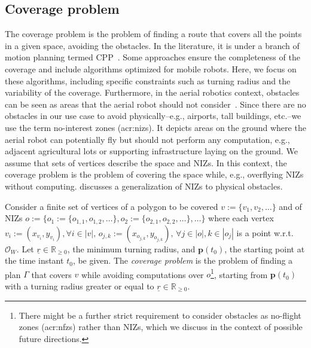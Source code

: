 \subsection{Coverage problem}

The coverage problem is the problem of finding a route that covers all the points in a given space, avoiding the obstacles. In the literature, it is under a branch of motion planning termed CPP~\citep{choset1998coverage,choset2001coverage,galceran2013survey}. Some approaches ensure the completeness of the coverage and include algorithms optimized for mobile robots. Here, we focus on these algorithms, including specific constraints such as turning radius and the variability of the coverage.
Furthermore, in the aerial robotics context, obstacles can be seen as areas that the aerial robot should not consider~\citep{cabreira2019survey}. Since there are no obstacles in our use case to avoid physically--e.g., airports, tall buildings, etc.--we use the term no-interest zones (\Gls{acr:niz}s). It depicts areas on the ground where the aerial robot can potentially fly but should not perform any computation, e.g., adjacent agricultural lots or supporting infrastructure laying on the ground. We assume that sets of vertices describe the space and NIZs. In this context, the coverage problem is the problem of covering the space while, e.g., overflying NIZs without computing. 
 discusses a generalization of NIZs to physical obstacles. 

\begin{pb}
  \label{pb:cov-pb}
  Consider a finite set of vertices of a polygon to be covered $v:=\{v_1,v_2,\dots\}$ and of NIZs $o:=\{o_1:=\{o_{1,1},o_{1,2},\dots\},o_2:=\{o_{2,1},o_{2,2},\dots\},\dots\}$ where each vertex $v_i:=(x_{v_i},y_{v_i}),\forall i\in|v|,\,o_{j,k}:=(x_{o_{j,k}},y_{o_{j,k}}),\,\forall j\in|o|,k\in|o_j|$ is a point w.r.t. $\mathcal{O}_W$. Let $\underline{r}\in\mathbb{R}_{\geq 0}$, the minimum turning radius, and $\mathbf{p}(t_0)$, the starting point at the time instant $t_0$, be given. The \emph{coverage problem} is the problem of finding a plan $\Gamma$ that covers $v$ while avoiding computations over $o$\footnote{There might be a further strict requirement to consider obstacles as no-flight zones (\Gls{acr:nfz}s) rather than NIZs, which we discuss in the context of possible future directions.}, starting from $\mathbf{p}(t_0)$ with a turning radius greater or equal to $\underline{r}\in\mathbb{R}_{\geq 0}$.
\end{pb}    

